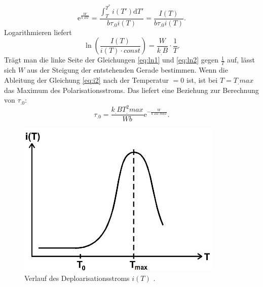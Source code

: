\begin{equation}
\mathrm{e}^{\frac{W}{k_.BT}}=\frac{\int_{T}^{T^*}i(T')\mathrm{d}T'}{b\tau_.0 i(T)}=\frac{I(T)}{b\tau_.0 i(T)}\text{.}\label{eq:i3}
\end{equation}
Logarithmieren liefert
\begin{equation}
\ln\left(\frac{I(T)}{i(T)\cdot const}\right)=\frac{W}{k_.B}\cdot\frac{1}{T}\text{.}\label{eq:ln2}
\end{equation}
Trägt man die linke Seite der Gleichungen \eqref{eq:ln1} und \eqref{eq:ln2} gegen $\frac{1}{T}$ auf, lässt sich $W$ aus der Steigung der entstehenden Gerade bestimmen.
Wenn die Ableitung der Gleichung \eqref{eq:i2} nach der Temperatur $=0$ ist, ist bei $T=T_.{max}$ das Maximum des Polarisationsstroms.
Das liefert eine Beziehung zur Berechnung von $\tau_.0$:
\begin{equation}
\tau_.0=\frac{k_.BT^2_.{max}}{W b}\mathrm{e}^{-\frac{W}{k_.BT_.{max}}}\text{.}\label{eq:tau0}
\end{equation}
\begin{figure}
	\centering
	\includegraphics[width=\linewidth-70pt,height=\textheight-70pt,keepaspectratio]{content/images/Verlauf.jpg}
	\caption{Verlauf des Deploarisationsstroms $i(T)$ \cite{V48}.}
	\label{fig:i}
\end{figure}